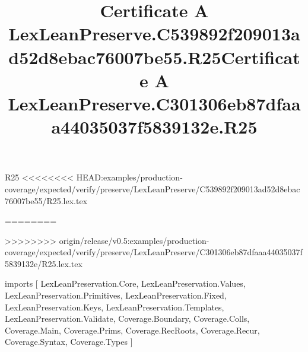 \begin{lexlean}{R25}
<<<<<<<< HEAD:examples/production-coverage/expected/verify/preserve/LexLeanPreserve/C539892f209013ad52d8ebac76007be55/R25.lex.tex
\title{Certificate A LexLeanPreserve.C539892f209013ad52d8ebac76007be55.R25}
========
\title{Certificate A LexLeanPreserve.C301306eb87dfaaa44035037f5839132e.R25}
>>>>>>>> origin/release/v0.5:examples/production-coverage/expected/verify/preserve/LexLeanPreserve/C301306eb87dfaaa44035037f5839132e/R25.lex.tex
\begin{coremodule}
imports [
  LexLeanPreservation.Core,
  LexLeanPreservation.Values,
  LexLeanPreservation.Primitives,
  LexLeanPreservation.Fixed,
  LexLeanPreservation.Keys,
  LexLeanPreservation.Templates,
  LexLeanPreservation.Validate,
  Coverage.Boundary,
  Coverage.Colls,
  Coverage.Main,
  Coverage.Prims,
  Coverage.RecRoots,
  Coverage.Recur,
  Coverage.Syntax,
  Coverage.Types
]


\end{coremodule}
\end{lexlean}
